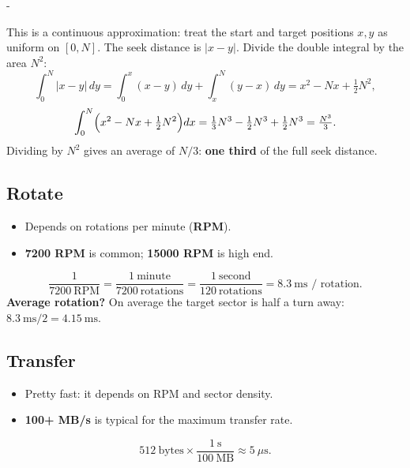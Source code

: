 \documentclass[11pt,a4paper]{article}
\makeatletter
\newcommand{\keepspace}[1]{\par\penalty-100\begingroup
  \setlength{\dimen@}{#1}\dimen@ii\pagegoal\advance\dimen@ii-\pagetotal
  \ifdim\dimen@>\dimen@ii\ifdim\dimen@ii>\z@\vfil\fi\break\fi\endgroup}
\makeatother
\begin{document}
\keepspace{14\baselineskip}
\begin{solbox}
This is a continuous approximation: treat the start and target positions
\(x,y\) as uniform on \([0,N]\). The seek distance is \(|x-y|\). Divide the
double integral by the area \(N^2\):
\[
  \int_0^N |x-y|\,dy
  = \int_0^x (x-y)\,dy + \int_x^N (y-x)\,dy
  = x^2 - Nx + \tfrac12 N^2,
\]
\[
  \int_0^N \Bigl(x^2 - Nx + \tfrac12 N^2\Bigr)dx
  = \tfrac13 N^3 - \tfrac12 N^3 + \tfrac12 N^3 = \tfrac{N^3}{3}.
\]
Dividing by \(N^2\) gives an average of \(N/3\): \textbf{one third} of the full
seek distance.
\end{solbox}

\subsection{Rotate}

\begin{itemize}
  \item Depends on rotations per minute (\textbf{RPM}).
  \item \textbf{7200 RPM} is common; \textbf{15000 RPM} is high end.
\end{itemize}

\begin{quizbox}
\[
  \frac{1}{7200\ \text{RPM}}
  = \frac{1\ \text{minute}}{7200\ \text{rotations}}
  = \frac{1\ \text{second}}{120\ \text{rotations}}
  = 8.3\ \text{ms / rotation}.
\]
\textbf{Average rotation?} On average the target sector is half a turn away:
\(8.3\ \text{ms} / 2 = 4.15\ \text{ms}\).
\end{quizbox}

\subsection{Transfer}

\begin{itemize}
  \item Pretty fast: it depends on RPM and sector density.
  \item \textbf{100+ MB/s} is typical for the maximum transfer rate.
\end{itemize}

\begin{quizbox}
\[
  512\ \text{bytes} \times \frac{1\ \text{s}}{100\ \text{MB}} \approx 5\ \mu\text{s}.
\]
\end{quizbox}
\end{document}
